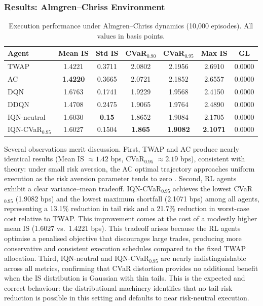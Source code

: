 \documentclass[11pt]{article}
\begin{document}
\subsubsection*{Results: Almgren--Chriss Environment}

\begin{table}[H]
    \centering
   
    \begin{tabular}{@{}lcccccc@{}}
        \toprule
        \textbf{Agent} & \textbf{Mean IS} & \textbf{Std IS} & \textbf{CVaR$_{0.90}$} & \textbf{CVaR$_{0.95}$} & \textbf{Max IS} & \textbf{GL} \\
        \midrule
        TWAP               & 1.4221 & 0.3711 & 2.0802 & 2.1956 & 2.6910 & 0.0000 \\
        AC                 & \textbf{1.4220} & 0.3665 & 2.0721 & 2.1852 & 2.6557 & 0.0000 \\
        DQN                & 1.6763 & 0.1741 & 1.9229 & 1.9568 & 2.4150 & 0.0000 \\
        DDQN               & 1.4708 & 0.2475 & 1.9065 & 1.9764 & 2.4890 & 0.0000 \\
        IQN-neutral        & 1.6030 & \textbf{0.15} & 1.8652 & 1.9084 & 2.1705 & 0.0000 \\
        IQN-CVaR$_{0.95}$  & 1.6027 & 0.1504 & \textbf{1.865} & \textbf{1.9082} & \textbf{2.1071} & 0.0000 \\
        \bottomrule
    \end{tabular}

     \caption{Execution performance under Almgren--Chriss dynamics (10{,}000 episodes). All values in basis points.}
    \label{tab:ac_results}
\end{table}
Several observations merit discussion.  First, TWAP and AC 
produce nearly identical results (Mean IS $\approx 1.42$ bps, 
CVaR$_{0.95}$ $\approx 2.19$ bps), consistent with theory: 
under small risk aversion, the AC optimal trajectory 
approaches uniform execution as the risk aversion parameter 
tends to zero \citet{almgren2001optimal}. Second, RL agents exhibit a clear variance--mean tradeoff.  
IQN-CVaR$_{0.95}$ achieves the lowest CVaR$_{0.95}$ (1.9082 
bps) and the lowest maximum shortfall (2.1071 bps) among all 
agents, representing a 13.1\% reduction in tail risk and a 
21.7\% reduction in worst-case cost relative to TWAP.  This 
improvement comes at the cost of a modestly higher mean IS 
(1.6027 vs.\ 1.4221 bps).  This tradeoff arises because the 
RL agents optimise a penalised objective that discourages 
large trades, producing more conservative and consistent 
execution schedules compared to the fixed TWAP allocation. Third, IQN-neutral and IQN-CVaR$_{0.95}$ are nearly 
indistinguishable across all metrics, confirming that CVaR 
distortion provides no additional benefit when the IS 
distribution is Gaussian with thin tails.  This is the 
expected and correct behaviour: the distributional machinery 
identifies that no tail-risk reduction is possible in this 
setting and defaults to near risk-neutral execution.
\end{document}

